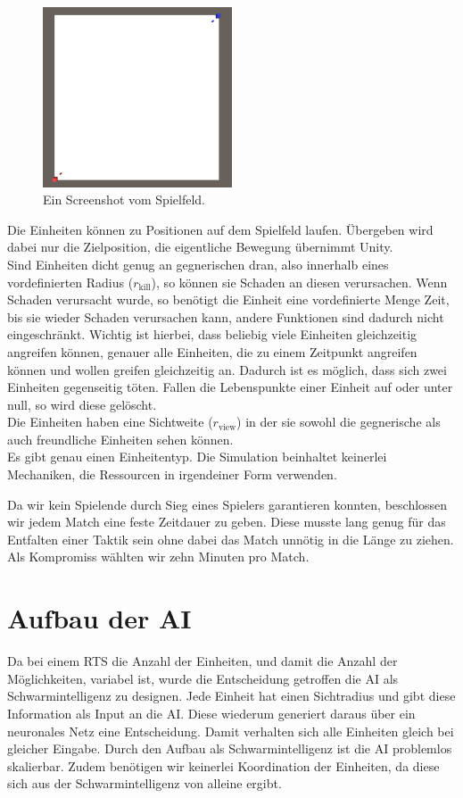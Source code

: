 \documentclass[
	12pt,
	a4paper,
	BCOR10mm,
	DIV14,
	headsepline,
	usegeometry,
]{scrreprt}
\begin{document}
\begin{figure}[h!]
	\centering
	\includegraphics[width = 0.5\textwidth]{Spielfeld.png}
	\caption{Ein Screenshot vom Spielfeld.}
	\label{Spielfeld}
\end{figure}

Die Einheiten können zu Positionen auf dem Spielfeld laufen. Übergeben wird dabei nur die Zielposition, die eigentliche Bewegung übernimmt Unity.\\
Sind Einheiten dicht genug an gegnerischen dran, also innerhalb eines vordefinierten Radius ($r_{\text{kill}}$), so können sie Schaden an diesen verursachen. Wenn Schaden verursacht wurde, so benötigt die Einheit eine vordefinierte Menge Zeit, bis sie wieder Schaden verursachen kann, andere Funktionen sind dadurch nicht eingeschränkt. Wichtig ist hierbei, dass beliebig viele Einheiten gleichzeitig angreifen können, genauer alle Einheiten, die zu einem Zeitpunkt angreifen können und wollen greifen gleichzeitig an. Dadurch ist es möglich, dass sich zwei Einheiten gegenseitig töten.
Fallen die Lebenspunkte einer Einheit auf oder unter null, so wird diese gelöscht.\\
Die Einheiten haben eine Sichtweite ($r_{\text{view}}$) in der sie sowohl die gegnerische als auch freundliche Einheiten sehen können.\\
Es gibt genau einen Einheitentyp. Die Simulation beinhaltet keinerlei Mechaniken, die Ressourcen in irgendeiner Form verwenden.

Da wir kein Spielende durch Sieg eines Spielers garantieren konnten, beschlossen wir jedem Match eine feste Zeitdauer zu geben. Diese musste lang genug für das Entfalten einer Taktik sein ohne dabei das Match unnötig in die Länge zu ziehen. Als Kompromiss wählten wir zehn Minuten pro Match.



\section{Aufbau der AI}
Da bei einem RTS die Anzahl der Einheiten, und damit die Anzahl der Möglichkeiten, variabel ist, wurde die Entscheidung getroffen die AI als Schwarmintelligenz zu designen.
Jede Einheit hat einen Sichtradius und gibt diese Information als Input an die AI. 
Diese wiederum generiert daraus über ein neuronales Netz eine Entscheidung. 
Damit verhalten sich alle Einheiten gleich bei gleicher Eingabe.
Durch den Aufbau als Schwarmintelligenz ist die AI problemlos skalierbar. 
Zudem benötigen wir keinerlei Koordination der Einheiten, da diese sich aus der Schwarmintelligenz von alleine ergibt.
\end{document}

